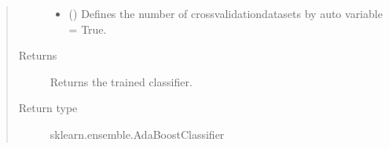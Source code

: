 \documentclass[letterpaper,10pt,english]{sphinxmanual}
\begin{document}
\begin{fulllineitems}
\begin{quote}
\begin{description}
\begin{itemize}
\item {} 
\sphinxAtStartPar
{} (\sphinxstyleliteralemphasis{\sphinxupquote{, }}) \textendash{} Defines the number of cross\sphinxhyphen{}validation\sphinxhyphen{}datasets by auto variable = True.

\end{itemize}

\item[{Returns}] \leavevmode
\sphinxAtStartPar
Returns the trained classifier.

\item[{Return type}] \leavevmode
\sphinxAtStartPar
sklearn.ensemble.AdaBoostClassifier

\end{description}\end{quote}

\end{fulllineitems}

\end{document}
